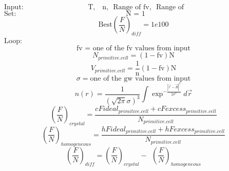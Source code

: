 \documentclass[12pt]{article}
\begin{document}
\begin{displaymath}\text{Input:~~~~~~~~~~~~~~~~~~~~~~~~~~~T,~~ n,~~Range of fv,~~Range of gw~~~~~~~~~~~~~~~~~~~~~~~~~~~~~~~~~~~}\end{displaymath} 
\begin{displaymath}\text{Set:~~~~~~~~~~~~~~~~~~~~~~~~~~~~~~~~~~~~~~~~~~~~~~N~=~1~~~~~~~~~~~~~~~~~~~~~~~~~~~~~~~~~~~~~~~~~~~~~~~~~~~~}\end{displaymath} 
\begin{displaymath}\text{Best}\left(\frac{F}{N}\right)_{diff}= 1e100\end{displaymath}
Loop: 
\begin{displaymath}\text{fv = one of the fv values from input}\end{displaymath}
\begin{equation}N_{primitive.cell}=(1-\text{fv})\text{N}\end{equation}
\begin{equation}V_{primitive.cell}=\frac{\text{1}}{\text{n}}(1-\text{fv})\text{N}\end{equation}
\begin{displaymath}\sigma = \text{one of the gw values from input}\end{displaymath}
\begin{equation}{n(r)=\frac{1}{\left(\sqrt{2\pi}\sigma\right)^3}\int\exp^{-\frac{|\vec{r}-\vec{R}|^2}{2\sigma^2}}d\vec{r}}\end{equation} 
\begin{equation}\left(\frac{F}{N}\right)_{crystal}=\frac{cFideal_{primitive.cell} + cFexcess_{primitive.cell}}{N_{primitive.cell}}\end{equation}
\begin{equation}\left(\frac{F}{N}\right)_{homogeneous}=\frac{hFideal_{primitive.cell} + hFexcess_{primitive.cell}}{N_{primitive.cell}}\end{equation}
\begin{equation}\left(\frac{F}{N}\right)_{diff}=\left(\frac{F}{N}\right)_{crystal}-{~~}\left(\frac{F}{N}\right)_{homogeneous}\end{equation}
\end{document}
